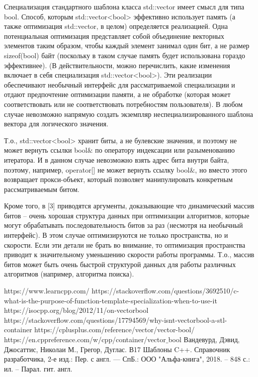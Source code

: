 \documentclass[a4paper,12pt]{article}	%
\begin{document}
	Специализация стандартного шаблона класса std::vector имеет смысл для типа bool. Способ, которым std::vector<bool> эффективно использует память (а также оптимизация std::vector, в целом) определяется реализацией. Одна потенциальная оптимизация представляет собой объединение векторных элементов таким образом, чтобы каждый элемент занимал один бит, а не размер sizeof(bool) байт (поскольку в таком случае память будет использована гораздо эффективнее). (В действительности, можно перечислить, какие изменения включает в себя специализация std::vector<bool>). Эти реализации обеспечивают необычный интерфейс для рассматриваемой специализации и отдают предпочтение оптимизации памяти, а не обработке (которая может соответствовать или не соответствовать потребностям пользователя). В любом случае невозможно напрямую создать экземпляр неспециализированного шаблона вектора для логического значения.
	
	Т.о., std::vector<bool> хранит биты, а не булевские значения, и поэтому не может вернуть ссылки bool$\&$ по оператору индексации или разыменованию итератора. И в данном случае невозможно взять адрес бита внутри байта, поэтому, например, operator[] не может вернуть ссылку bool$\&$, но вместо этого возвращает прокси-объект, который позволяет манипулировать конкретным рассматриваемым битом.
	
	Кроме того, в [3] приводятся аргументы, доказывающие что динамический массив битов -- очень хорошая структура данных при оптимизации алгоритмов, которые могут обрабатывать последовательность битов за раз (несмотря на необычный интерфейс). В этом случае оптимизируются не только пространства, но и скорости. Если эти детали не брать во внимание, то оптимизация пространства приводит к значительному уменьшению скорости работы программы. Т.о., массив битов может быть очень быстрой структурой данных для работы различных алгоритмов (например, алгоритма поиска).

\newpage


 
	\begin{thebibliography}{}
	
    	 https://www.learncpp.com/
		 https://stackoverflow.com/questions/3692510/c-what-is-the-purpose-of-function-template-specialization-when-to-use-it
		 https://isocpp.org/blog/2012/11/on-vectorbool
		 https://stackoverflow.com/questions/17794569/why-isnt-vectorbool-a-stl-container
		 https://cplusplus.com/reference/vector/vector-bool/
		 https://en.cppreference.com/w/cpp/container/vector$\_$bool
		 Вандевурд, Дэвид, Джосаттис, Николаи М., Грегор, Дуглас. В17 Шаблоны C++. Справочник разработчика, 2-е изд.: Пер. с англ. — СпБ.: ООО "Альфа-книга", 2018. -- 848 с.: ил. -- Парал. гит. англ.
		
	\end{thebibliography}
\end{document}
